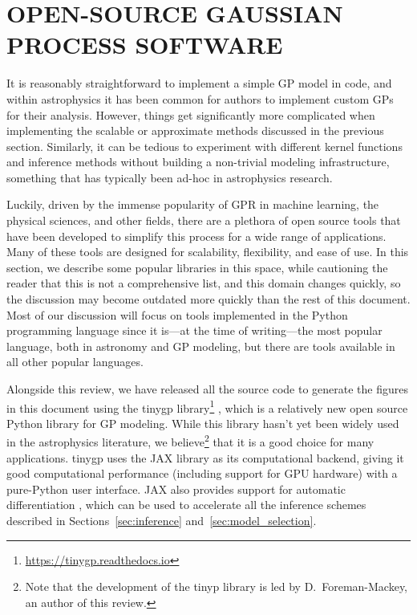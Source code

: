 \documentclass[letterpaper]{ar-1col}
\newcommand{\project}[1]{\textsf{#1}}
\begin{document}
\section{OPEN-SOURCE GAUSSIAN PROCESS SOFTWARE}
\label{sec:open}

It is reasonably straightforward to implement a simple GP model in code, and within astrophysics it has been common for authors to implement custom GPs for their analysis.
However, things get significantly more complicated when implementing the scalable or approximate methods discussed in the previous section.
Similarly, it can be tedious to experiment with different kernel functions and inference methods without building a non-trivial modeling infrastructure, something that has typically been ad-hoc in astrophysics research.

Luckily, driven by the immense popularity of GPR in machine learning, the physical sciences, and other fields, there are a plethora of open source tools that have been developed to simplify this process for a wide range of applications.
Many of these tools are designed for scalability, flexibility, and ease of use.
In this section, we describe some popular libraries in this space, while cautioning the reader that this is not a comprehensive list, and this domain changes quickly, so the discussion may become outdated more quickly than the rest of this document.
Most of our discussion will focus on tools implemented in the \project{Python} programming language since it is---at the time of writing---the most popular language, both in astronomy and GP modeling, but there are tools available in all other popular languages.

Alongside this review, we have released all the source code to generate the figures in this document using the \project{tinygp} library\footnote{\url{https://tinygp.readthedocs.io}} \citep{tinygp}, which is a relatively new open source \project{Python} library for GP modeling.
While this library hasn't yet been widely used in the astrophysics literature, we believe\footnote{Note that the development of the \project{tinyp} library is led by D.\ Foreman-Mackey, an author of this review.} that it is a good choice for many applications.
\project{tinygp} uses the \project{JAX} library as its computational backend, giving it good computational performance (including support for GPU hardware) with a pure-\project{Python} user interface.
\project{JAX} also provides support for automatic differentiation \citep[e.g.,][]{autodiff}, which can be used to accelerate all the inference schemes described in Sections~\ref{sec:inference} and~\ref{sec:model_selection}.
\end{document}
